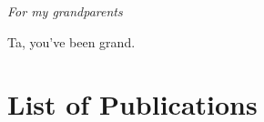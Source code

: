 
\begin{dedication}
\textit{For my grandparents}
\end{dedication}

\begin{acknowledgements}
Ta, you've been grand.
\end{acknowledgements}

\chapter{List of Publications}
\label{chapter:publications}
%
